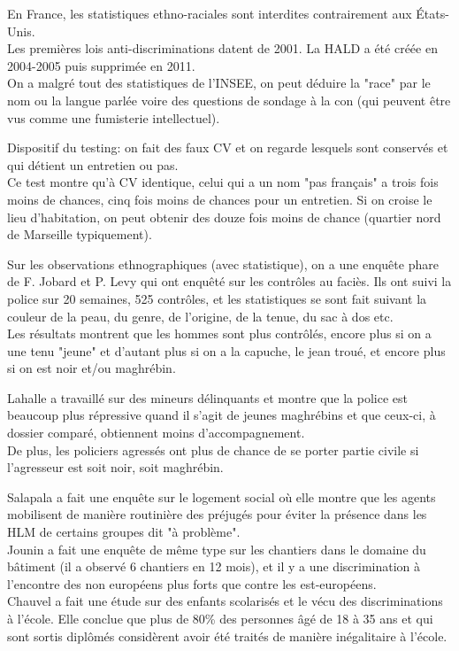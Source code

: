 \documentclass[12pt, a4paper, openany]{book}
\begin{document}
En France, les statistiques ethno-raciales sont interdites contrairement aux États-Unis. \\
Les premières lois anti-discriminations datent de 2001. La HALD a été créée en 2004-2005 puis supprimée en 2011. \\
On a malgré tout des statistiques de l'INSEE, on peut déduire la "race" par le nom ou la langue parlée voire des questions de sondage à la con (qui peuvent être vus comme une fumisterie intellectuel). 


Dispositif du testing: on fait des faux CV et on regarde lesquels sont conservés et qui détient un entretien ou pas. \\
Ce test montre qu'à CV identique, celui qui a un nom "pas français" a trois fois moins de chances, cinq fois moins de chances pour un entretien. Si on croise le lieu d'habitation, on peut obtenir des douze fois moins de chance (quartier nord de Marseille typiquement).


Sur les observations ethnographiques (avec statistique), on a une enquête phare de F. Jobard et P. Levy qui ont enquêté sur les contrôles au faciès. Ils ont suivi la police sur 20 semaines, 525 contrôles, et les statistiques se sont fait suivant la couleur de la peau, du genre, de l'origine, de la tenue, du sac à dos etc. \\
Les résultats montrent que les hommes sont plus contrôlés, encore plus si on a une tenu "jeune" et d'autant plus si on a la capuche, le jean troué, et encore plus si on est noir et/ou maghrébin. 


Lahalle a travaillé sur des mineurs délinquants et montre que la police est beaucoup plus répressive quand il s'agit de jeunes maghrébins et que ceux-ci, à dossier comparé, obtiennent moins d'accompagnement. \\
De plus, les policiers agressés ont plus de chance de se porter partie civile si l'agresseur est soit noir, soit maghrébin.


Salapala a fait une enquête sur le logement social où elle montre que les agents mobilisent de manière routinière des préjugés pour éviter la présence dans les HLM de certains groupes dit "à problème". \\
Jounin a fait une enquête de même type sur les chantiers dans le domaine du bâtiment (il a observé 6 chantiers en 12 mois), et il y a une discrimination à l'encontre des non européens plus forts que contre les est-européens. \\
Chauvel a fait une étude sur des enfants scolarisés et le vécu des discriminations à l'école. Elle conclue que plus de 80\% des personnes âgé de 18 à 35 ans et qui sont sortis diplômés considèrent avoir été traités de manière inégalitaire à l'école. 
\end{document}
